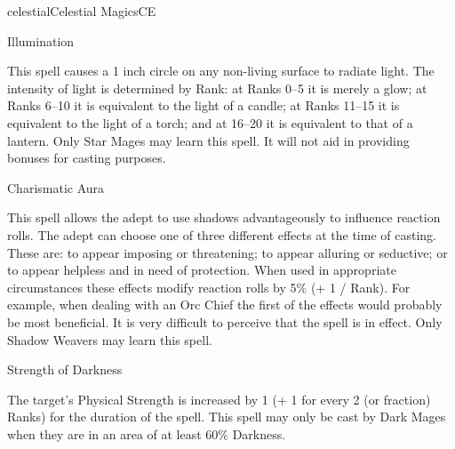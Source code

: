 \begin{college}[1.3]{celestial}{Celestial Magics}{CE}
\begin{spell}[G-9 Star]{Illumination}

\begin{effects}
This spell causes a 1 inch circle on any non-living surface to radiate
light.  The intensity of light is determined by Rank: at Ranks 0--5 it
is merely a glow; at Ranks 6--10 it is equivalent to the light of a
candle; at Ranks 11--15 it is equivalent to the light of a torch; and
at 16--20 it is equivalent to that of a lantern.  Only Star Mages may
learn this spell.  It will not aid in providing bonuses for casting
purposes.
\end{effects}
\end{spell}

\begin{spell}[G-9 Shadow]{Charismatic Aura}

\begin{effects}
This spell allows the adept to use shadows advantageously to influence
reaction rolls.  The adept can choose one of three different effects
at the time of casting.  These are: to appear imposing or threatening;
to appear alluring or seductive; or to appear helpless and in need of
protection.  When used in appropriate circumstances these effects
modify reaction rolls by 5\% (+ 1 / Rank).  For example, when dealing
with an Orc Chief the first of the effects would probably be most
beneficial.  It is very difficult to perceive that the spell is in
effect.  Only Shadow Weavers may learn this spell.
\end{effects}
\end{spell}

\begin{spell}[G-9 Dark]{Strength of Darkness}

\begin{effects}
The target's Physical Strength is increased by 1 (+ 1 for every 2 (or
fraction) Ranks) for the duration of the spell.  This spell may only
be cast by Dark Mages when they are in an area of at least 60\%
Darkness.
\end{effects}
\end{spell}


\end{college}
